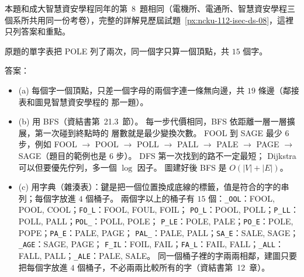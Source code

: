 \begin{pastsoln}
本題和成大智慧資安學程同年的第~8~題相同（電機所、電通所、智慧資安學程三個系所共用同一份考卷），完整的詳解見歷屆試題~\ref{px:ncku-112-isec-ds-08}，這裡只列答案和重點。

原題的單字表把 POLE 列了兩次，同一個字只算一個頂點，共 $15$ 個字。

答案：
\begin{itemize}
\item (a) 每個字一個頂點，只差一個字母的兩個字連一條無向邊，共 $19$ 條邊（鄰接表和圖見智慧資安學程的
那一題）。
\item (b) 用 BFS（資結書第~21.3~節）。 每一步代價相同，BFS 依距離一層一層擴展，第一次碰到終點時的
層數就是最少變換次數。 FOOL 到 SAGE 最少 $6$ 步，例如 FOOL $\to$ POOL $\to$ POLL $\to$ PALL
$\to$ PALE $\to$ PAGE $\to$ SAGE（題目的範例也是 $6$ 步）。 DFS 第一次找到的路不一定最短；
Dijkstra 可以但要優先佇列，多一個 $\log$ 因子。 圖建好後 BFS 是 $O(|V| + |E|)$。
\item (c) 用字典（雜湊表）：鍵是把一個位置換成底線的標籤，值是符合的字的串列；每個字放進 $4$ 個桶子。
兩個字以上的桶子有 $15$ 個：\texttt{\_OOL}：FOOL, POOL, COOL；\texttt{FO\_L}：FOOL, FOUL, FOIL；
\texttt{PO\_L}：POOL, POLL；\texttt{P\_LL}：POLL, PALL；\texttt{POL\_}：POLL, POLE；
\texttt{P\_LE}：POLE, PALE；\texttt{PO\_E}：POLE, POPE；\texttt{PA\_E}：PALE, PAGE；
\texttt{PAL\_}：PALE, PALL；\texttt{SA\_E}：SALE, SAGE；\texttt{\_AGE}：SAGE, PAGE；
\texttt{F\_IL}：FOIL, FAIL；\texttt{FA\_L}：FAIL, FALL；\texttt{\_ALL}：FALL, PALL；\texttt{\_ALE}：PALE, SALE。
同一個桶子裡的字兩兩相鄰，建圖只要把每個字放進 $4$ 個桶子，不必兩兩比較所有的字（資結書第~12~章）。
\end{itemize}
\end{pastsoln}
